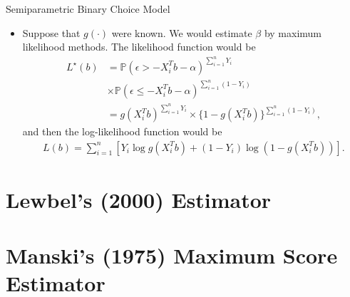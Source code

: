 \documentclass[xcolor=svgnames,dvipdfmx,cjk]{beamer}
\theoremstyle{example}
\def\P{\mathbb{P}}
\begin{document}
  
\begin{frame}{Semiparametric Binary Choice Model}
\begin{itemize}
  \item Suppose that $g(\cdot)$ were known. 
        We would estimate $\beta$ by maximum likelihood methods.
        The likelihood function would be 
        \begin{align*}
          L^{\star}(b) &= \P(\epsilon > -X_i^Tb - \alpha)^{\sum_{i=1}^n Y_i}\\
                       &\times 
                        \P(\epsilon \leq -X_i^Tb  -\alpha)^{\sum_{i=1}^n (1-Y_i)} \\
                       &= g(X_i^Tb)^{\sum_{i=1}^n Y_i} \times \{1-g(X_i^Tb)\}^{\sum_{i=1}^n (1-Y_i)},
        \end{align*}
        and then the log-likelihood function would be
        \begin{align*}
          L(b) = \sum_{i=1}^{n}[Y_i \log g(X_i^Tb) + (1 - Y_i) \log (1 - g(X_i^Tb))].
        \end{align*}
\end{itemize}
\end{frame}  
 




















  
  
\section{Lewbel's (2000) Estimator}
  
  
  
  
  
  
  
  
  
\section{Manski's (1975) Maximum Score Estimator}
  
\end{document}
